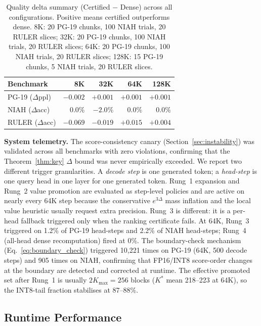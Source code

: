 \documentclass[11pt,a4paper]{article}
\theoremstyle{definition}
\theoremstyle{remark}
\begin{document}
\begin{table}[H]
\centering
\caption{Quality delta summary (Certified $-$ Dense) across all configurations.  Positive means certified outperforms dense.  8K: 20 PG-19 chunks, 100 NIAH trials, 20 RULER slices; 32K: 20 PG-19 chunks, 100 NIAH trials, 20 RULER slices; 64K: 20 PG-19 chunks, 100 NIAH trials, 20 RULER slices; 128K: 15 PG-19 chunks, 5 NIAH trials, 20 RULER slices.}
\label{tab:delta_summary}
\small
\begin{tabular}{lrrrr}
\toprule
\textbf{Benchmark} & \textbf{8K} & \textbf{32K} & \textbf{64K} & \textbf{128K} \\
\midrule
PG-19 ($\Delta$ppl) & $-0.002$ & $+0.001$ & $+0.001$ & $+0.001$ \\
NIAH ($\Delta$acc)   & $0.0\%$ & $-2.0\%$ & $0.0\%$ & $0.0\%$ \\
RULER ($\Delta$acc)  & $-0.069$ & $-0.019$ & $+0.015$ & $+0.004$ \\
\bottomrule
\end{tabular}
\end{table}

\textbf{System telemetry.}  The score-consistency canary (Section~\ref{sec:instability}) was validated across all benchmarks with zero violations, confirming that the Theorem~\ref{thm:key} $\Delta$ bound was never empirically exceeded.  We report two different trigger granularities.  A \emph{decode step} is one generated token; a \emph{head-step} is one query head in one layer for one generated token.  Rung~1 expansion and Rung~2 value promotion are evaluated as step-level policies and are active on nearly every 64K step because the conservative $e^{3\Delta}$ mass inflation and the local value heuristic usually request extra precision.  Rung~3 is different: it is a per-head fallback triggered only when the ranking certificate fails.  At 64K, Rung~3 triggered on 1.2\% of PG-19 head-steps and 2.2\% of NIAH head-steps; Rung~4 (all-head dense recomputation) fired at 0\%.  The boundary-check mechanism (Eq.~\ref{eq:boundary_check}) triggered 10{,}221 times on PG-19 (64K, 500 decode steps) and 905 times on NIAH, confirming that FP16/INT8 score-order changes at the boundary are detected and corrected at runtime.  The effective promoted set after Rung~1 is usually $2K_{\max}{=}256$ blocks ($K^*$ mean 218--223 at 64K), so the INT8-tail fraction stabilises at 87--88\%.


\subsection{Runtime Performance}
\label{sec:performance}
\end{document}
